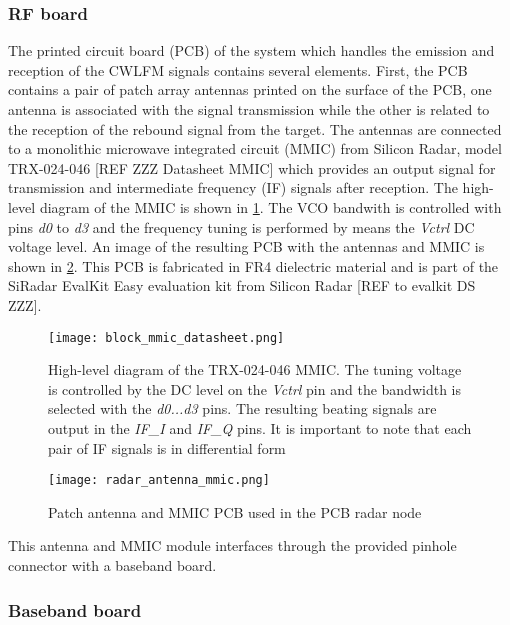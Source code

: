 \subsubsection{RF board}

The printed circuit board (PCB) of the system which handles the emission and reception of the CWLFM signals contains several elements. First, the PCB contains a pair of patch array antennas printed on the surface of the PCB, one antenna is associated with the signal transmission while the other is related to the reception of the rebound signal from the target. The antennas are connected to a monolithic microwave integrated circuit (MMIC) from Silicon Radar, model TRX-024-046 [REF ZZZ Datasheet MMIC] which provides an output signal for transmission and intermediate frequency (IF) signals after reception. The high-level diagram of the MMIC is shown in \cref{fig:block_mmic}. The VCO bandwith is controlled with pins \textit{d0} to \textit{d3} and the frequency tuning is performed by means the \textit{Vctrl} DC voltage level. An image of the resulting PCB with the antennas and MMIC is shown in \cref{fig:rf_board}. This PCB is fabricated in FR4 dielectric material and is part of the SiRadar EvalKit Easy evaluation kit from Silicon Radar [REF to evalkit DS ZZZ].

\begin{figure}[ht]
	\centering
	\texttt{[image: block\_mmic\_datasheet.png]}
	\caption{High-level diagram of the TRX-024-046 MMIC. The tuning voltage is controlled by the DC level on the \textit{Vctrl} pin and the bandwidth is selected with the \textit{d0...d3} pins. The resulting beating signals are output in the \textit{IF\_I} and \textit{IF\_Q} pins. It is important to note that each pair of IF signals is in differential form \label{fig:block_mmic}}
\end{figure}

\begin{figure}[ht]
	\centering
	\texttt{[image: radar\_antenna\_mmic.png]}
	\caption{Patch antenna and MMIC PCB used in the PCB radar node \label{fig:rf_board}}
\end{figure}

This antenna and MMIC module interfaces through the provided pinhole connector with a baseband board.

\subsubsection{Baseband board}

